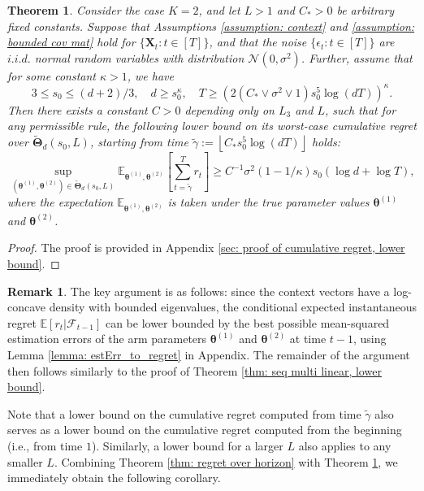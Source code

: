 \documentclass[aos,preprint]{imsart}
\theoremstyle{plain}
\newtheorem{theorem}{Theorem}
\theoremstyle{definition}
\newtheorem{remark}{Remark}
\newcommand{\bTheta}{\boldsymbol{\Theta}}
\newcommand{\btheta}{\boldsymbol{\theta}}
\newcommand{\bd}[1]{\boldsymbol{#1}}
\newcommand{\bX}{\boldsymbol{X}}
\newcommand{\cF}{\mathcal{F}}
\newcommand{\Exp}{\mathbb{E}}
\begin{document}
\begin{theorem}\label{thm: regret lower bound}
Consider the case $K=2$, and let $L > 1$ and $C_{*} > 0$ be arbitrary fixed constants. Suppose that Assumptions \ref{assumption: context} and \ref{assumption: bounded cov mat} hold for $\{\bX_t: t \in [T]\}$, and that the noise $\{\epsilon_t:t\in[T]\}$ are $i.i.d.$ normal random variables with distribution $\mathcal{N}(0,\sigma^2)$. Further, assume that for some constant $\kappa > 1$, we have
\begin{equation}\label{eq: regret lower bound 1}
3 \leq s_0 \leq (d+2)/3, \quad  d \geq s_0^{\kappa}, \quad 
T \geq \left( 2 (C_{*} \vee \sigma^2 \vee 1) s_0^5 \log(dT)\right)^{\kappa}.
\end{equation}
Then there exists a constant $C>0$ depending only on $L_3$ and $L$, such that for any permissible rule,  the following lower bound on its worst-case cumulative regret  over $\widetilde{\bTheta}_{d}(s_0,L)$, starting from time $\tilde{\gamma} := \left\lfloor  C_{*} s_0^5\log(dT) \right\rfloor$ holds:
$$
\sup_{(\btheta^{(1)}, \btheta^{(2)}) \in \widetilde{\bTheta}_{d}(s_0,L)}  \Exp_{\btheta^{(1)}, \btheta^{(2)}}\left[\sum_{t=\tilde{\gamma}}^T r_t \right] \geq  C^{-1} \sigma^2 (1-1/\kappa) s_0 \left(\log d + \log T \right),$$
where the expectation $\Exp_{\btheta^{(1)}, \btheta^{(2)}}$ is taken under the true parameter values $\btheta^{(1)}$ and $\btheta^{(2)}$.
\end{theorem}
\begin{proof}
The proof is provided in Appendix \ref{sec: proof of cumulative regret, lower bound}.
\end{proof}

\begin{remark}
The key argument is as follows: since the context vectors have a log-concave density with bounded eigenvalues, the conditional expected instantaneous regret $\Exp[r_t \vert \cF_{t-1}]$ can be lower bounded by the best possible mean-squared estimation errors of the arm parameters $\btheta^{(1)}$ and $\btheta^{(2)}$ at time $t-1$, using Lemma \ref{lemma: estErr_to_regret} in Appendix. The remainder of the argument then follows similarly to the proof of Theorem \ref{thm: seq multi linear, lower bound}.
\end{remark}

Note that a lower bound on the cumulative regret computed from time $\tilde{\gamma}$ also serves as a lower bound on the cumulative regret computed from the beginning (i.e., from time $1$). Similarly, a lower bound for a larger $L$ also applies to any smaller $L$.     
Combining Theorem \ref{thm: regret over horizon} with Theorem \ref{thm: regret lower bound}, we immediately obtain the following corollary.
\end{document}
